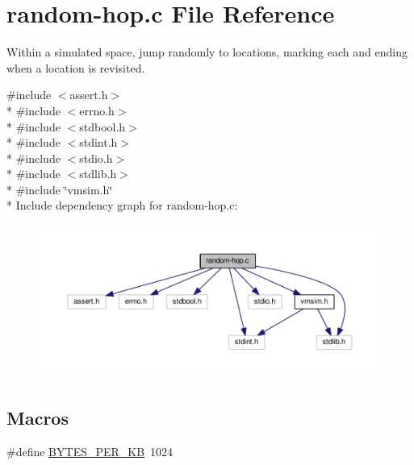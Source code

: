 \hypertarget{random-hop_8c}{\section{random-\/hop.c File Reference}
\label{random-hop_8c}
}


Within a simulated space, jump randomly to locations, marking each and ending when a location is revisited.  


{\ttfamily \#include $<$assert.\+h$>$}\\*
{\ttfamily \#include $<$errno.\+h$>$}\\*
{\ttfamily \#include $<$stdbool.\+h$>$}\\*
{\ttfamily \#include $<$stdint.\+h$>$}\\*
{\ttfamily \#include $<$stdio.\+h$>$}\\*
{\ttfamily \#include $<$stdlib.\+h$>$}\\*
{\ttfamily \#include \char`\"{}vmsim.\+h\char`\"{}}\\*
Include dependency graph for random-\/hop.c\+:\nopagebreak
\begin{figure}[H]
\begin{center}
\leavevmode
\includegraphics[width=350pt]{random-hop_8c__incl}
\end{center}
\end{figure}
\subsection*{Macros}
\begin{DoxyCompactItemize}
\item 
\#define \hyperlink{random-hop_8c_ab5fde4a4261bca6820d8cd5b0d3a1b8d}{B\+Y\+T\+E\+S\+\_\+\+P\+E\+R\+\_\+\+K\+B}~1024
\end{DoxyCompactItemize}
